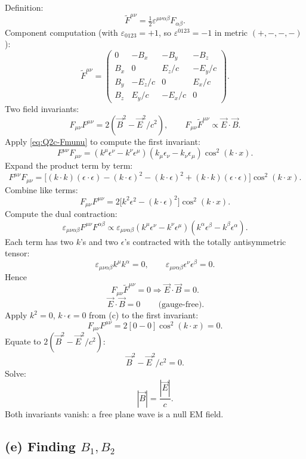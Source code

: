 \documentclass[11pt]{article}
\begin{document}
Definition:
\[ \tilde F^{\mu\nu}=\tfrac12\varepsilon^{\mu\nu\alpha\beta}F_{\alpha\beta}. \]
Component computation (with $\varepsilon_{0123}=+1$, so $\varepsilon^{0123}=-1$ in metric $(+,-,-,-)$):
\begin{equation}
\tilde F^{\mu\nu}=\begin{pmatrix}0&-B_x&-B_y&-B_z\\B_x&0&E_z/c&-E_y/c\\B_y&-E_z/c&0&E_x/c\\B_z&E_y/c&-E_x/c&0\end{pmatrix}.
\end{equation}
Two field invariants:
\[ F_{\mu\nu}F^{\mu\nu}=2\!\left(\vec B^2-\vec E^2/c^2\right),\qquad F_{\mu\nu}\tilde F^{\mu\nu}\propto\vec E\cdot\vec B. \]
Apply \eqref{eq:Q2c-Fmunu} to compute the first invariant:
\[ F^{\mu\nu}F_{\mu\nu}=(k^\mu\epsilon^\nu-k^\nu\epsilon^\mu)(k_\mu\epsilon_\nu-k_\nu\epsilon_\mu)\cos^2(k\cdot x). \]
Expand the product term by term:
\[ F^{\mu\nu}F_{\mu\nu}=\bigl[(k\!\cdot\!k)(\epsilon\!\cdot\!\epsilon)-(k\!\cdot\!\epsilon)^2-(k\!\cdot\!\epsilon)^2+(k\!\cdot\!k)(\epsilon\!\cdot\!\epsilon)\bigr]\cos^2(k\cdot x). \]
Combine like terms:
\[ F_{\mu\nu}F^{\mu\nu}=2\bigl[k^2\epsilon^2-(k\cdot\epsilon)^2\bigr]\cos^2(k\cdot x). \]
Compute the dual contraction:
\[ \varepsilon_{\mu\nu\alpha\beta}F^{\mu\nu}F^{\alpha\beta}\propto\varepsilon_{\mu\nu\alpha\beta}(k^\mu\epsilon^\nu-k^\nu\epsilon^\mu)(k^\alpha\epsilon^\beta-k^\beta\epsilon^\alpha). \]
Each term has two $k$'s and two $\epsilon$'s contracted with the totally antisymmetric tensor:
\[ \varepsilon_{\mu\nu\alpha\beta}k^\mu k^\alpha=0,\qquad\varepsilon_{\mu\nu\alpha\beta}\epsilon^\nu\epsilon^\beta=0. \]
Hence
\[ F_{\mu\nu}\tilde F^{\mu\nu}=0\Rightarrow\vec E\cdot\vec B=0. \]
\begin{equation}
\boxed{\,\vec E\cdot\vec B=0\,}\qquad\text{(gauge-free).}
\end{equation}
Apply $k^2=0$, $k\cdot\epsilon=0$ from (c) to the first invariant:
\[ F_{\mu\nu}F^{\mu\nu}=2[0-0]\cos^2(k\cdot x)=0. \]
Equate to $2(\vec B^2-\vec E^2/c^2)$:
\[ \vec B^2-\vec E^2/c^2=0. \]
Solve:
\begin{equation}
\boxed{\,|\vec B|=\frac{|\vec E|}{c}.\,}
\end{equation}
Both invariants vanish: a free plane wave is a null EM field.

\subsection*{(e) Finding $B_1,B_2$}
\end{document}
